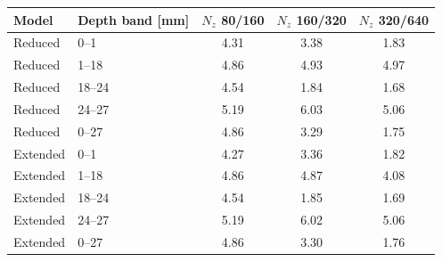 \begin{tabular}{llccc}
\toprule
Model & Depth band [mm] & $N_z$ 80/160 & $N_z$ 160/320 & $N_z$ 320/640 \\
\midrule
Reduced & 0--1 & 4.31 & 3.38 & 1.83 \\
Reduced & 1--18 & 4.86 & 4.93 & 4.97 \\
Reduced & 18--24 & 4.54 & 1.84 & 1.68 \\
Reduced & 24--27 & 5.19 & 6.03 & 5.06 \\
Reduced & 0--27 & 4.86 & 3.29 & 1.75 \\
Extended & 0--1 & 4.27 & 3.36 & 1.82 \\
Extended & 1--18 & 4.86 & 4.87 & 4.08 \\
Extended & 18--24 & 4.54 & 1.85 & 1.69 \\
Extended & 24--27 & 5.19 & 6.02 & 5.06 \\
Extended & 0--27 & 4.86 & 3.30 & 1.76 \\
\bottomrule
\end{tabular}

